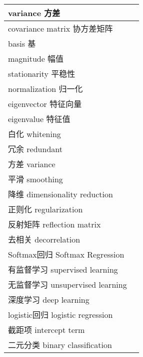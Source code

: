 \begin{longtable}[h]{m{}m{}}
variance 方差 \\
  \midrule

covariance matrix 协方差矩阵 \\
  \midrule

basis 基 \\
  \midrule

magnitude 幅值 \\
  \midrule

stationarity 平稳性 \\
  \midrule

normalization 归一化 \\
  \midrule

eigenvector 特征向量 \\
  \midrule

eigenvalue 特征值 \\
  \midrule

白化 whitening \\
  \midrule

冗余 redundant \\
  \midrule

方差 variance \\
  \midrule

平滑 smoothing \\
  \midrule

降维 dimensionality reduction \\
  \midrule

正则化 regularization \\
  \midrule

反射矩阵 reflection matrix \\
  \midrule

去相关 decorrelation \\
  \midrule

Softmax回归 Softmax Regression \\
  \midrule

有监督学习 supervised learning \\
  \midrule

无监督学习 unsupervised learning \\
  \midrule

深度学习 deep learning \\
  \midrule

logistic回归 logistic regression \\
  \midrule

截距项 intercept term \\
  \midrule

二元分类 binary classification \\
  \midrule


\end{longtable}

